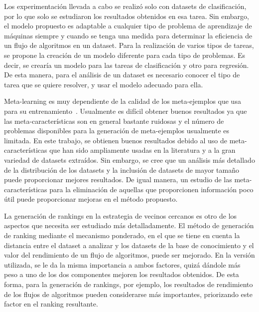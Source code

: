 Los experimentación llevada a cabo se realizó solo con datasets de clasificación, por lo que solo se estudiaron los resultados obtenidos en esa tarea. Sin embargo, el modelo propuesto es adaptable a cualquier tipo de problema de aprendizaje de máquinas siempre y cuando se tenga una medida para determinar la eficiencia de un flujo de algoritmos en un dataset. Para la realización de varios tipos de tareas, se propone la creación de un modelo diferente para cada tipo de problemas. Es decir, se crearía un modelo para las tareas de clasificación y otro para regresión. De esta manera, para el análisis de un dataset es necesario conocer el tipo de tarea que se quiere resolver, y usar el modelo adecuado para ella.

Meta-learning es muy dependiente de la calidad de los meta-ejemplos que usa para su entrenamiento~\cite{gomes2012combining}. Usualmente es difícil obtener buenos resultados ya que las meta-características son en general bastante ruidosas y el número de problemas disponibles para la generación de meta-ejemplos usualmente es limitada. En este trabajo, se obtienen buenos resultados debido al uso de meta-características que han sido ampliamente usadas en la literatura y a la gran variedad de datasets extraídos. Sin embargo, se cree que un análisis más detallado de la distribución de los datasets y la inclusión de datasets de mayor tamaño puede proporcionar mejores resultados. De igual manera, un estudio de las meta-características para la eliminación de aquellas que proporcionen información poco útil puede proporcionar mejoras en el método propuesto.

La generación de rankings en la estrategia de vecinos cercanos es otro de los aspectos que necesita ser estudiado más detalladamente. El método de generación de ranking mediante el mecanismo ponderado, en el que se tiene en cuenta la distancia entre el dataset a analizar y los datasets de la base de conocimiento y el valor del rendimiento de un flujo de algoritmos, puede ser mejorado. En la versión utilizada, se le da la misma importancia a ambos factores, quizá dándole más peso a uno de los dos componentes mejoren los resultados obtenidos. De esta forma, para la generación de rankings, por ejemplo, los resultados de rendimiento de los flujos de algoritmos pueden considerarse más importantes, priorizando este factor en el ranking resultante.






